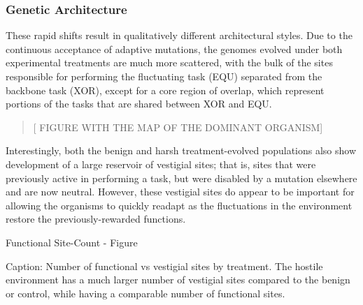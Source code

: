 \subsubsection{Genetic Architecture}

These rapid shifts result in qualitatively different architectural styles. Due to the continuous acceptance of adaptive mutations, the genomes evolved under both experimental treatments are much more scattered, with the bulk of the sites responsible for performing the fluctuating task (EQU) separated from the backbone task (XOR), except for a core region of overlap, which represent portions of the tasks that are shared between XOR and EQU.
\begin{quote}
[ FIGURE WITH THE MAP OF THE DOMINANT ORGANISM]
\end{quote}
Interestingly, both the benign and harsh treatment-evolved populations also show development of a large reservoir of vestigial sites; that is, sites that were previously active in performing a task, but were disabled by a mutation elsewhere and are now neutral.  However, these vestigial sites do appear to be important for allowing the organisms to quickly readapt as the fluctuations in the environment restore the previously-rewarded functions.

Functional Site-Count - Figure

Caption: Number of functional vs vestigial sites by treatment. The hostile environment has a much larger number of vestigial sites compared to the benign or control, while having a comparable number of functional sites.

